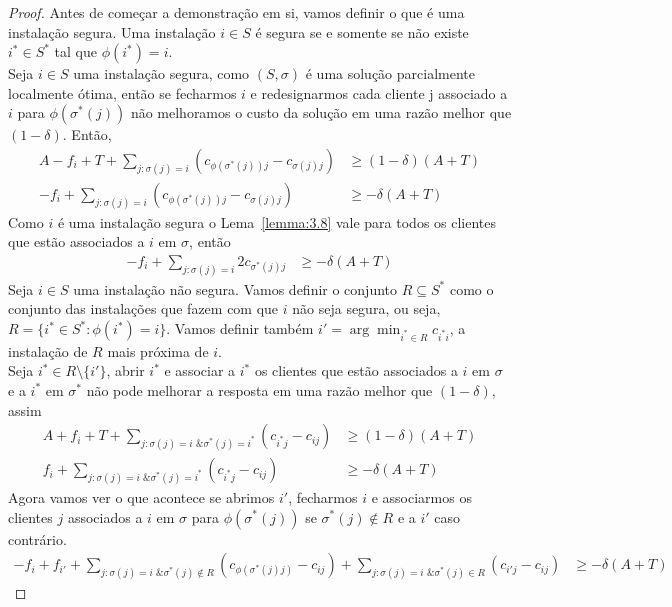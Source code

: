 \documentclass[12pt]{article}
\begin{document}
\begin{proof}
    Antes de começar a demonstração em si, vamos definir o que é uma instalação segura. Uma instalação $i \in S$ é segura se e somente se não existe $i^* \in S^*$ tal que $\phi(i^*)=i$. \\
    Seja $i \in S$ uma instalação segura, como $(S,\sigma)$ é uma solução parcialmente localmente ótima, então se fecharmos $i$ e redesignarmos cada cliente j associado a $i$ para $\phi(\sigma^*(j))$ não melhoramos o custo da solução em uma razão melhor que $(1-\delta)$. Então,
    \begin{align*}
        A - f_i + T + \sum_{j:\sigma(j) = i} (c_{\phi(\sigma^*(j))j} - c_{\sigma(j)j}) &\geq (1-\delta)(A+T)\\
        - f_i + \sum_{j:\sigma(j) = i} (c_{\phi(\sigma^*(j))j} - c_{\sigma(j)j}) &\geq -\delta(A+T)
    \end{align*}
    Como $i$ é uma instalação segura o Lema~\ref{lemma:3.8} vale para todos os clientes que estão associados a $i$ em $\sigma$, então
    \begin{align} 
        \label{segura}
        - f_i + \sum_{j:\sigma(j) = i} 2c_{\sigma^*(j)j} &\geq -\delta(A+T)
    \end{align}
    Seja $i\in S$ uma instalação não segura. Vamos definir o conjunto $R \subseteq S^*$ como o conjunto das instalações que fazem com que $i$ não seja segura, ou seja, $R = \{i^* \in S^* : \phi(i^*) = i\}$. Vamos definir também $i' = \arg\min_{i^* \in R} c_{i^*i}$, a instalação de $R$ mais próxima de $i$. \\
    Seja $i^* \in R\setminus\{i'\}$, abrir $i^*$ e associar a $i^*$ os clientes que estão associados a $i$ em $\sigma $ e a $i^*$ em $\sigma^*$ não pode melhorar a resposta em uma razão melhor que $(1-\delta)$, assim
    \begin{align}
        A + f_i + T + \sum_{j: \sigma(j) = i \text{ \& } \sigma^*(j) = i^*}(c_{i^*j} - c_{ij}) &\geq (1-\delta)(A+T) \\
        \label{não segura}
        f_i + \sum_{j: \sigma(j) = i \text{ \& } \sigma^*(j) = i^*}(c_{i^*j} - c_{ij}) &\geq -\delta(A+T)
    \end{align}
    Agora vamos ver o que acontece se abrimos $i'$, fecharmos $i$ e associarmos os clientes $j$ associados a $i$ em $\sigma$ para $\phi(\sigma^*(j))$ se $\sigma^*(j) \not \in R$ e a $i'$ caso contrário.
    \begin{align*}
        - f_i + f_{i'} + \sum_{j: \sigma(j) = i \text{ \& } \sigma^*(j)\not \in R}(c_{\phi(\sigma^*(j)j)} - c_{ij}) + \sum_{j: \sigma(j)=i \text{ \& }\sigma^*(j) \in R}(c_{i'j} - c_{ij}) &\geq -\delta(A+T)

\end{align*}
\end{proof}
\end{document}
